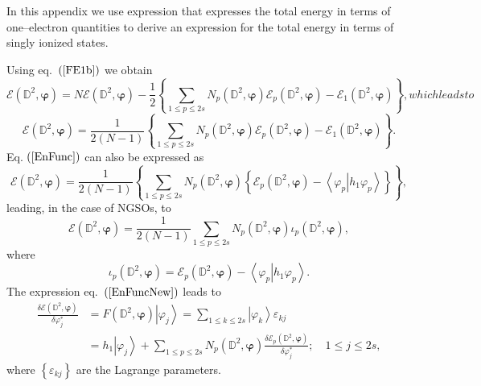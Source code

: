 \documentclass[aps,preprint]{revtex4}%
\begin{document}
In this appendix we use expression that expresses the total energy in terms of
one--electron quantities to derive an expression for the total energy in terms
of singly ionized states.

Using eq.\ $\left(  \ref{FE1b}\right)  $ we obtain
\begin{subequations}
\begin{equation}
\mathcal{E}\left(  \mathbb{D}^{2},\bm{\varphi}\right)  =N\mathcal{E}\left(
\mathbb{D}^{2},\bm{\varphi}\right)  -\frac{1}{2}\left\{  \sum_{1\leq p\leq
2s}N_{p}\left(  \mathbb{D}^{2},\bm{\varphi}\right)  \mathcal{E}_{p}\left(
\mathbb{D}^{2},\bm{\varphi}\right)  -\mathcal{E}_{1}\left(  \mathbb{D}%
^{2},\bm{\varphi}\right)  \right\}  ,
\end{equation}
which leads to
\end{subequations}
\begin{equation}
\mathcal{E}\left(  \mathbb{D}^{2},\bm{\varphi}\right)  =\frac{1}{2\left(
N-1\right)  }\left\{  \sum_{1\leq p\leq2s}N_{p}\left(  \mathbb{D}%
^{2},\bm{\varphi}\right)  \mathcal{E}_{p}\left(  \mathbb{D}^{2}%
,\bm{\varphi}\right)  -\mathcal{E}_{1}\left(  \mathbb{D}^{2}%
,\bm{\varphi}\right)  \right\}  . \label{EnFunc}%
\end{equation}
Eq. $\left(  \ref{EnFunc}\right)  $ can also be expressed as
\begin{equation}
\mathcal{E}\left(  \mathbb{D}^{2},\bm{\varphi}\right)  =\frac{1}{2\left(
N-1\right)  }\left\{  \sum_{1\leq p\leq2s}N_{p}\left(  \mathbb{D}%
^{2},\bm{\varphi}\right)  \left\{  \mathcal{E}_{p}\left(  \mathbb{D}%
^{2},\bm{\varphi}\right)  -\left\langle \left.  \varphi_{p}\right\vert
h_{1}\varphi_{p}\right\rangle \right\}  \right\}  , \label{EnFuncNew}%
\end{equation}
leading, in the case of NGSOs, to
\begin{equation}
\mathcal{E}\left(  \mathbb{D}^{2},\bm{\varphi}\right)  =\frac{1}{2\left(
N-1\right)  }\sum_{1\leq p\leq2s}N_{p}\left(  \mathbb{D}^{2}%
,\bm{\varphi }\right)  \iota_{p}\left(  \mathbb{D}^{2},\bm{\varphi}\right)  ,
\end{equation}
where
\begin{equation}
\iota_{p}\left(  \mathbb{D}^{2},\bm{\varphi}\right)  =\mathcal{E}_{p}\left(
\mathbb{D}^{2},\bm{\varphi}\right)  -\left\langle \left.  \varphi
_{p}\right\vert h_{1}\varphi_{p}\right\rangle .
\end{equation}
The expression eq.\ $\left(  \ref{EnFuncNew}\right)  $ leads to
\begin{align}
\frac{\delta\mathcal{E}\left(  \mathbb{D}^{2},\bm{\varphi}\right)  }%
{\delta\varphi_{j}^{\ast}}  &  =F\left(  \mathbb{D}^{2},\bm{\varphi }\right)
\left\vert \varphi_{j}\right\rangle =\sum_{1\leq k\leq2s}\left\vert
\varphi_{k}\right\rangle \varepsilon_{kj}\nonumber\\
&  =h_{1}\left\vert \varphi_{j}\right\rangle +\sum_{1\leq p\leq2s}N_{p}\left(
\mathbb{D}^{2},\bm{\varphi}\right)  \frac{\delta\mathcal{E}_{p}\left(
\mathbb{D}^{2},\bm{\varphi}\right)  }{\delta\varphi_{j}^{\ast}};\quad1\leq
j\leq2s,
\end{align}
where $\left\{  \varepsilon_{kj}\right\}  $ are the Lagrange parameters.
\end{document}
